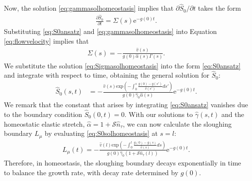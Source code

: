 Now, the solution \eqref{eq:gammasolhomeostasis} implies that $\partial\hat{S}_0/\partial t$ takes the form
\begin{align}
\frac{\partial\hat{S}_0}{\partial t} = \Sigma(s)\mathrm{e}^{-g(0)t}.\label{eq:S0ansatz}
\end{align}
Substituting \eqref{eq:S0ansatz} and \eqref{eq:gammasolhomeostasis} into Equation \eqref{eq:flowvelocity} implies that 
\begin{align}
\Sigma(s) = -\frac{\hat{v}(s)}{g(0)\hat{\alpha}(s)\Gamma(s)}.\label{eq:Sigmasolhomeostasis}
\end{align}
We substitute the solution \eqref{eq:Sigmasolhomeostasis} into the form \eqref{eq:S0ansatz} and integrate with respect to time, obtaining the general solution for $\hat{S}_0$:
\begin{align}
\hat{S}_0(s, t) &=  -\frac{\hat{v}(s)\mathrm{exp}\left(-\int^s_0\frac{g(0) - g(s')}{\hat{v}(s')}ds'\right)}{g(0)\hat{\gamma}_0\hat{\alpha}(s)}\mathrm{e}^{-g(0)t}.\label{eq:S0solhomeostasis}
\end{align}
We remark that the constant that arises by integrating \eqref{eq:S0ansatz} vanishes due to the boundary condition $\hat{S}_0(0, t) = 0$. With our solutions to $\hat{\gamma}(s, t)$ and the homeostatic elastic stretch, $\hat{\alpha} = 1 + \mathcal{S}\hat{n}_\tau$, we can now calculate the sloughing boundary $L_\mu$ by evaluating \eqref{eq:S0solhomeostasis} at $s = l$:
\begin{align}
L_\mu(t) =-\frac{\hat{v}(l)\mathrm{exp}\left(-\int^l_0\frac{g(0) - g(s)}{\hat{v}(s)}ds\right)}{g(0)\hat{\gamma}_0(1 + \mathcal{S}\hat{n}_\tau(l))}\mathrm{e}^{-g(0)t}.\label{eq:homeostasissloughingboundary}
\end{align}
Therefore, in homeostasis, the sloughing boundary decays exponentially in time to balance the growth rate, with decay rate determined by $g(0)$. 


